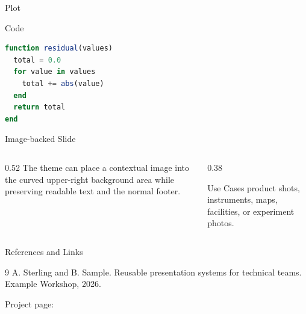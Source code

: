 \documentclass[aspectratio=1610]{beamer}
\begin{document}
\begin{frame}{Plot}
  \begin{center}
  \end{center}
\end{frame}

\begin{frame}[fragile]{Code}
\begin{lstlisting}[language=Julia]
function residual(values)
  total = 0.0
  for value in values
    total += abs(value)
  end
  return total
end
\end{lstlisting}
\end{frame}


\begin{frame}{Image-backed Slide}
  \begin{columns}[T,totalwidth=\textwidth]
    \begin{column}{0.52\textwidth}
      The theme can place a contextual image into the curved upper-right
      background area while preserving readable text and the normal footer.
    \end{column}
    \begin{column}{0.38\textwidth}
      \begin{block}{Use Cases}
        product shots, instruments, maps, facilities, or experiment photos.
      \end{block}
    \end{column}
  \end{columns}
\end{frame}
\noslidebackground


\begin{frame}{References and Links}
  \begin{thebibliography}{9}
      A. Sterling and B. Sample.
      \newblock Reusable presentation systems for technical teams.
      \newblock Example Workshop, 2026.
  \end{thebibliography}

  \vspace{3mm}
  Project page: 
\end{frame}

\end{document}
